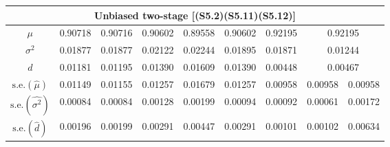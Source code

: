 \documentclass[11pt,a5paper,twoside]{book}
\begin{document}
\begin{table}[t!]
\begin{center}
{\begin{tabular}{ccccccccc}
\hline\hline
\multicolumn{9}{c}{{Unbiased two-stage [(S5.2)(S5.11)(S5.12)]}}\\
\hline
$\mu$ & 0.90718 & 0.90716 & 0.90602 & 0.89558 & 0.90602 & 0.92195 & \multicolumn{2}{c}{0.92195}  \\
$\sigma^2$ & 0.01877 & 0.01877 & 0.02122 & 0.02244 & 0.01895 & 0.01871 & \multicolumn{2}{c}{0.01244}  \\
$d$ & 0.01181 & 0.01195 & 0.01390 & 0.01609 & 0.01390 & 0.00448 & \multicolumn{2}{c}{0.00467}  \\

\hline
$\mbox{s.e.}(\widehat{\mu})$& 0.01149 & 0.01155 & 0.01257 & 0.01679 & 0.01257 & 0.00958 & 0.00958 & 0.00958 \\
$\mbox{s.e.}(\widehat{\sigma^2})$  & 0.00084 & 0.00084 & 0.00128 & 0.00199 & 0.00094 & 0.00092 & 0.00061 & 0.00172 \\
  $\mbox{s.e.}(\widehat{d})$ & 0.00196 & 0.00199 & 0.00291 & 0.00447 & 0.00291 & 0.00101 & 0.00102 & 0.00634 \\

\hline\hline
\end{tabular}}
\end{center}
\end{table}



\end{document}
